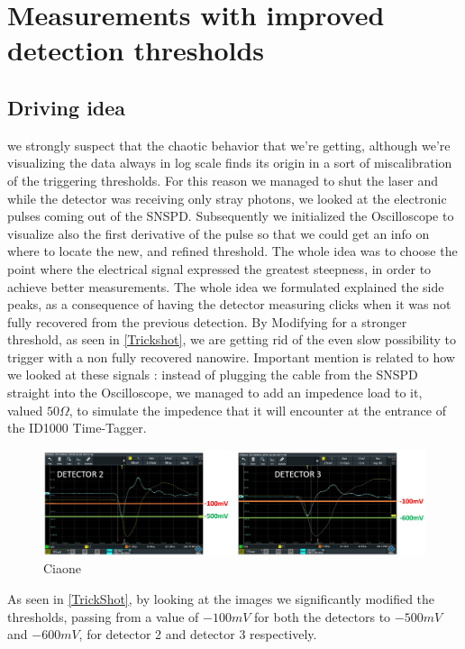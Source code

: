 \section{Measurements with improved detection thresholds}
\subsection{Driving idea}
we strongly suspect that the chaotic behavior that we're getting, although we're visualizing the data always in log scale finds its origin in a sort of miscalibration of the triggering thresholds.
For this reason we managed to shut the laser and while the detector was receiving only stray photons, we looked at the electronic pulses coming out of the SNSPD.
Subsequently we initialized the Oscilloscope to visualize also the first derivative of the pulse so that we could get an info on where to locate the new, and refined threshold. The whole idea was to choose the point where the electrical signal expressed the greatest steepness, in order to achieve better measurements.
The whole idea we formulated explained the side peaks, as a consequence of having the detector measuring clicks when it was not fully recovered from the previous detection. By Modifying for a stronger threshold, as seen in \autoref{Trickshot}, we are getting rid of the even slow possibility to trigger with a non fully recovered nanowire.
Important mention is related to how we looked at these signals : instead of plugging the cable from the SNSPD straight into the Oscilloscope, we managed to add an impedence load to it, valued $50 \Omega$, to simulate the impedence that it will encounter at the entrance of the ID1000 Time-Tagger.

\begin{figure}[hbtp]
\centering
\includegraphics[width=1\textwidth]{ScopeShots.jpg}
\caption{Ciaone}
\label{TrickShot}
\end{figure}

As seen in \autoref{TrickShot}, by looking at the images we significantly modified the thresholds, passing from a value of $-100mV$ for both the detectors to $-500mV$ and $-600mV$, for detector 2 and detector 3 respectively.


